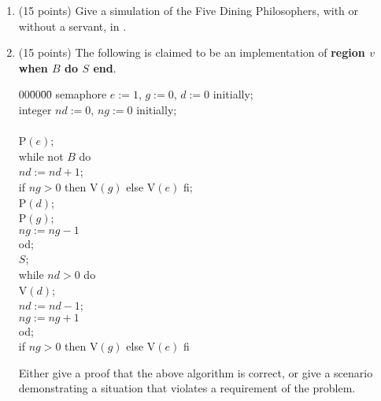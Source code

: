 \begin{enumerate}
\item (15 points) Give a simulation of the Five Dining Philosophers, with or
without a servant, in \SR.

\newpage
\item (15 points)
The following is claimed to be an implementation of {\bf region $v$
when $B$ do $S$ end}.

{\bf
\begin{tabbing}
00\=00\=00\=\kill
semaphore $e := 1$, $g := 0$, $d := 0$ initially;\\
integer $nd := 0$, $ng := 0$ initially;\\
\\
P$(e)$;\\
while not $B$ do\+\\
  $nd := nd + 1$;\\
  if $ng > 0$ then V$(g)$ else V$(e)$ fi;\\
  P$(d)$;\\
  P$(g)$;\\
  $ng := ng - 1$\-\\
od;\\
$S$;\\
while $nd > 0$ do\+\\
  V$(d)$;\\
  $nd := nd - 1$;\\
  $ng := ng + 1$\-\\
od;\\
if $ng > 0$ then V$(g)$ else V$(e)$ fi\\
\end{tabbing}
}

\noindent
Either give a proof that the above algorithm is correct, or give a
scenario demonstrating a situation that violates a requirement of
the problem.
\end{enumerate}

